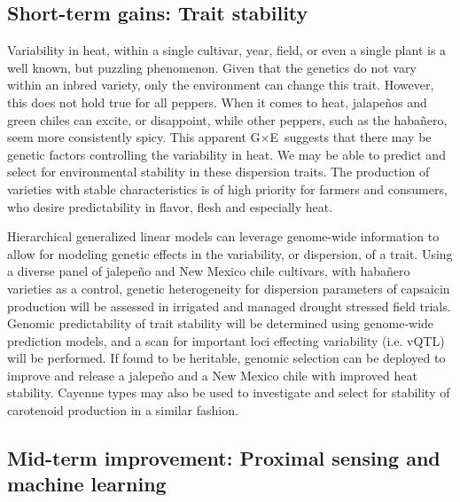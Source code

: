 \documentclass[11pt]{article}
\newcommand{\gxe}{G$\times$E}
\begin{document}
\subsection*{Short-term gains: Trait stability}



Variability in heat, within a single cultivar, year, field, or even a single plant is a well known, but puzzling phenomenon. Given that the genetics do not vary within an inbred variety, only the environment can change this trait. However, this does not hold true for all peppers. When it comes to heat, jalape\~{n}os and green chiles can excite, or disappoint, while other peppers, such as the haba\~{n}ero, seem more consistently spicy. This apparent \gxe\, suggests that there may be genetic factors controlling the variability in heat. We may be able to predict and select for environmental stability in these dispersion traits. The production of varieties with stable characteristics is of high priority for farmers and consumers, who desire predictability in flavor, flesh and especially heat. 

Hierarchical generalized linear models can leverage genome-wide information to allow for modeling genetic effects in the variability, or dispersion, of a trait. Using a diverse panel of jalepe\~{n}o and New Mexico chile cultivars, with haba\~{n}ero varieties  as a control, genetic heterogeneity for dispersion parameters of capsaicin production will be assessed in irrigated and managed drought stressed field trials. Genomic predictability of trait stability will be determined using genome-wide prediction models, and a scan for important loci effecting variability (i.e. vQTL) will be performed. If found to be heritable, genomic selection can be deployed to improve and release a jalepe\~{n}o and a New Mexico chile with improved heat stability. Cayenne types may also be used to investigate and select for stability of carotenoid production in a similar fashion. 



\subsection*{Mid-term improvement: Proximal sensing and machine learning}
\end{document}

